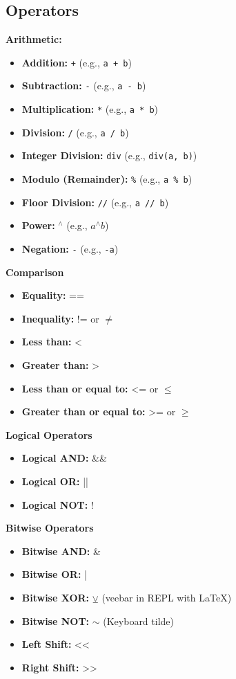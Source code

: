 \documentclass{report}
\begin{document}
    \subsection{Operators}
    \bigbreak \noindent 
    \textbf{Arithmetic:}
    \begin{itemize}
        \item \textbf{Addition:} \texttt{+} (e.g., \texttt{a + b})
        \item \textbf{Subtraction:} \texttt{-} (e.g., \texttt{a - b})
        \item \textbf{Multiplication:} \texttt{*} (e.g., \texttt{a * b})
        \item \textbf{Division:} \texttt{/} (e.g., \texttt{a / b})
        \item \textbf{Integer Division:} \texttt{div} (e.g., \texttt{div(a, b)})
        \item \textbf{Modulo (Remainder):} \texttt{\%} (e.g., \texttt{a \% b})
        \item \textbf{Floor Division:} \texttt{//} (e.g., \texttt{a // b})
        \item \textbf{Power:} \texttt{$^{\land}$} (e.g., \texttt{$a^{\land}b$})
        \item \textbf{Negation:} \texttt{-} (e.g., \texttt{-a})
    \end{itemize}
    \bigbreak \noindent 
    \textbf{Comparison}
    \begin{itemize}
        \item \textbf{Equality:} ==
        \item \textbf{Inequality:} != or $\ne$
        \item \textbf{Less than:} <
        \item \textbf{Greater than:} >
        \item \textbf{Less than or equal to:} <= or $ \leq$
        \item \textbf{Greater than or equal to:} >= or $ \geq $
    \end{itemize}
    \bigbreak \noindent 
    \textbf{Logical Operators}
    \begin{itemize}
        \item \textbf{Logical AND:} \&\&
        \item \textbf{Logical OR:} ||
        \item \textbf{Logical NOT:} !
    \end{itemize}
    \bigbreak \noindent 
    \textbf{Bitwise Operators}
    \begin{itemize}
        \item \textbf{Bitwise AND:} \&
        \item \textbf{Bitwise OR:} |
        \item \textbf{Bitwise XOR:} $\veebar$ (veebar in REPL with \LaTeX)
        \item \textbf{Bitwise NOT:} $\sim$ (Keyboard tilde)
        \item \textbf{Left Shift:} <<
        \item \textbf{Right Shift:} >>
    \end{itemize}
\end{document}
